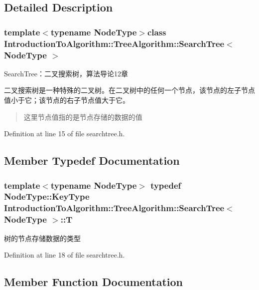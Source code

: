 \subsection{Detailed Description}
\subsubsection*{template$<$typename Node\+Type$>$class Introduction\+To\+Algorithm\+::\+Tree\+Algorithm\+::\+Search\+Tree$<$ Node\+Type $>$}

Search\+Tree：二叉搜索树，算法导论12章 

二叉搜索树是一种特殊的二叉树。在二叉树中的任何一个节点，该节点的左子节点值小于它；该节点的右子节点值大于它。

\begin{quote}
这里节点值指的是节点存储的数据的值\end{quote}


Definition at line 15 of file searchtree.\+h.



\subsection{Member Typedef Documentation}
\hypertarget{class_introduction_to_algorithm_1_1_tree_algorithm_1_1_search_tree_a0a9b2de6326042f2a1fa8a3a0def67ab}{}
\subsubsection[{T}]{\setlength{\rightskip}{0pt plus 5cm}template$<$typename Node\+Type$>$ typedef Node\+Type\+::\+Key\+Type {\bf Introduction\+To\+Algorithm\+::\+Tree\+Algorithm\+::\+Search\+Tree}$<$ {\bf Node\+Type} $>$\+::{\bf T}}\label{class_introduction_to_algorithm_1_1_tree_algorithm_1_1_search_tree_a0a9b2de6326042f2a1fa8a3a0def67ab}
树的节点存储数据的类型 

Definition at line 18 of file searchtree.\+h.



\subsection{Member Function Documentation}
\hypertarget{class_introduction_to_algorithm_1_1_tree_algorithm_1_1_search_tree_a83724f0079d16419d4cceba74602cee1}{}
